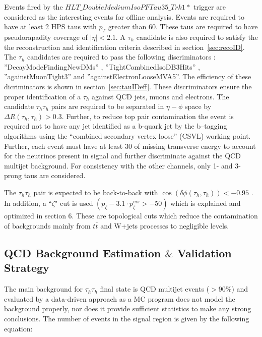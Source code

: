 Events fired by the $HLT\_DoubleMediumIsoPFTau35\_Trk1*$ trigger are considered as the interesting events for offline analysis. Events are required to have at 
least 2 HPS taus with $p_{T}$ greater than 60\gev . These taus are required to have pseudorapadity coverage of $|\eta| < 2.1$. A $\tau_{h}$ candidate is also 
required to satisfy the the reconstruction and identification criteria described in section~\ref{sec:recoID}. The $\tau_{h}$ candidates are required to pass the 
following discriminators : ''DecayModeFindingNewDMs'' , ''TightCombinedIsoDB3Hits'' , ''againstMuonTight3''  and ''againstElectronLooseMVA5''.  The efficiency of 
these dicriminators is shown in section~\ref{sec:tauIDeff}. These discriminators ensure the proper identification of a $\tau_{h}$ against QCD jets, muons and electrons. The candidate $\tau_{h}\tau_{h}$ pairs are required to be separated in $\eta-\phi$ space by $\Delta R(\tau_{h},\tau_{h}) > 0.3 $. Further, to reduce top pair contamination the event is required not to have any jet identified as a b-quark jet by the b–tagging algorithms using the “combined secondary vertex loose” (CSVL) working point. Further, each event must have at least 30 \gev of missing transverse energy to account for the neutrinos present in signal and further discriminate against the QCD multijet background. For consistency with the other channels, only 1- and 3-prong taus are considered. 

The $\tau_{h}\tau_{h}$ pair is expected to be back-to-back with $\cos(\delta\phi(\tau_{h},\tau_{h})) < -0.95$ . In addition, a ``$\zeta$" cut is used 
$(p_{\zeta}- 3.1\cdot p_{\zeta}^{vis} > -50)$ which is explained and optimized in section 6. These are topological cuts which reduce the contamination of backgrounds mainly from  $t\bar{t}$ and W+jets processes to negligible levels.  



\subsection{QCD Background Estimation $\&$ Validation Strategy}

The main background for $\tau_{h}\tau_{h}$ final state is QCD multijet events ($>90\%$) and evaluated by a data-driven approach as a MC program does not model the background properly, nor does it provide sufficient statistics to make any strong conclusions.
The number of events in the signal region is given by the following equation: 

